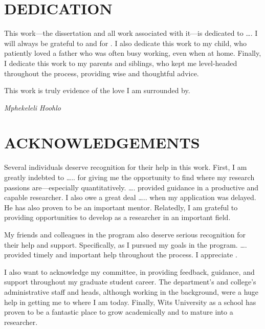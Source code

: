 \documentclass[]{DissertateUSU}
\begin{document}
\newpage

 \fancyhead[R]{\thepage} \fancyfoot[C]{}
\chapter*{DEDICATION} 

This work---the dissertation and all work associated with it---is
dedicated to \ldots. I will always be grateful to and for . I also
dedicate this work to my child, who patiently loved a father who was
often busy working, even when at home. Finally, I dedicate this work to
my parents and siblings, who kept me level-headed throughout the
process, providing wise and thoughtful advice.

This work is truly evidence of the love I am surrounded by.

\hspace{10.5 cm} \emph{Mphekeleli Hoohlo}

\newpage

 \fancyhead[R]{\thepage} \fancyfoot[C]{}
\chapter*{ACKNOWLEDGEMENTS}

Several individuals deserve recognition for their help in this work.
First, I am greatly indebted to \ldots{}.. for giving me the opportunity
to find where my research passions are---especially quantitatively.
\ldots{}. provided guidance in a productive and capable researcher. I
also owe a great deal \ldots{}.. when my application was delayed. He has
also proven to be an important mentor. Relatedly, I am grateful to
providing opportunities to develop as a researcher in an important
field.

My friends and colleagues in the program also deserve serious
recognition for their help and support. Specifically, as I pursued my
goals in the program. \ldots{}. provided timely and important help
throughout the process. I appreciate .

I also want to acknowledge my committee, in providing feedback,
guidance, and support throughout my graduate student career. The
department's and college's administrative staff and heads, although
working in the background, were a huge help in getting me to where I am
today. Finally, Wits University as a school has proven to be a fantastic
place to grow academically and to mature into a researcher.
\end{document}
